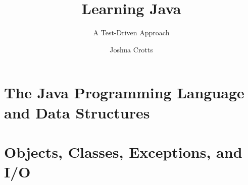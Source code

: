 \documentclass[graybox,envcountchap,sectrefs]{style/svmono}
\begin{document}
\author{Joshua Crotts}
\title{Learning Java}
\subtitle{A Test-Driven Approach}
\maketitle

\frontmatter%





\tableofcontents


\mainmatter%
\part{The Java Programming Language\\ and Data Structures}



\part{Objects, Classes, Exceptions, and I/O}

% 
% 
% 
% 
% 
% 

\backmatter%





\printindex

\end{document}

